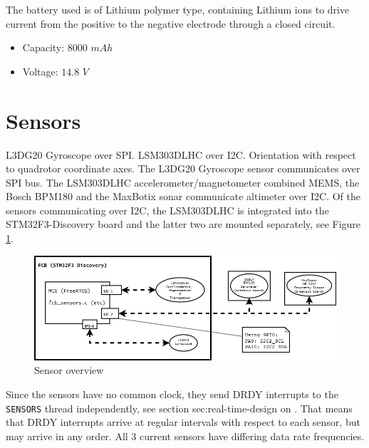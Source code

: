 \documentclass[a4paper]{report}
\begin{document}
The battery used is of Lithium polymer type, containing Lithium ions to drive current from the positive to the negative electrode through a closed circuit.

\begin{itemize}
  \item Capacity: $8000$ $mAh$
  \item Voltage: $14.8$ $V$
\end{itemize}

	\section{Sensors}

L3DG20 Gyroscope over SPI. LSM303DLHC over I2C. Orientation with respect to quadrotor coordinate axes. The L3DG20 Gyroscope sensor communicates over SPI bus. The LSM303DLHC accelerometer/magnetometer combined MEMS, the Bosch BPM180 and the MaxBotix sonar communicate altimeter over I2C. Of the sensors communicating over I2C, the LSM303DLHC is integrated into the STM32F3-Discovery board and the latter two are mounted separately, see Figure \ref{fig:sensor_hw_overview}.

\begin{figure}[h]
    \centering
    \includegraphics[width=\textwidth]{images/FcbSensorHWConfiguration.png}
    \caption{Sensor overview}
    \label{fig:sensor_hw_overview}
\end{figure}
Since the sensors have no common clock, they send DRDY interrupts to the \texttt{SENSORS} thread independently, see section {sec:real-time-design} on \pageref{sec:real-time-design}. That means that DRDY interrupts arrive at regular intervals with respect to each sensor, but may arrive in any order. All 3 current sensors have differing data rate frequencies.
\end{document}

